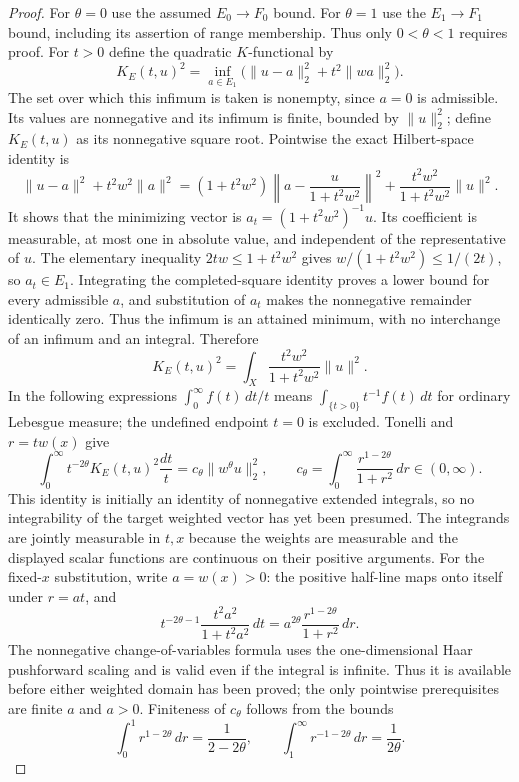 \documentclass[11pt,a4paper]{article}
\theoremstyle{definition}
\theoremstyle{remark}
\begin{document}
\begin{proof}
For $\theta=0$ use the assumed $E_0\to F_0$ bound. For $\theta=1$
use the $E_1\to F_1$ bound, including its assertion of range membership.
Thus only $0<\theta<1$ requires proof. For $t>0$ define the quadratic
$K$-functional by
\[
 K_E(t,u)^2=\inf_{a\in E_1}\bigl(\|u-a\|_2^2+t^2\|wa\|_2^2\bigr).
\]
The set over which this infimum is taken is nonempty, since $a=0$
is admissible. Its values are nonnegative and its infimum is finite,
bounded by $\|u\|_2^2$; define $K_E(t,u)$ as its nonnegative square
root. Pointwise the exact Hilbert-space identity is
\[
 \|u-a\|^2+t^2w^2\|a\|^2
 =(1+t^2w^2)\left\|a-\frac{u}{1+t^2w^2}\right\|^2
   +\frac{t^2w^2}{1+t^2w^2}\|u\|^2.
\]
It shows that the minimizing vector is
$a_t=(1+t^2w^2)^{-1}u$. Its coefficient is measurable, at most one
in absolute value, and independent of the representative of $u$.
The elementary inequality $2tw\leq1+t^2w^2$ gives
$w/(1+t^2w^2)\leq1/(2t)$, so $a_t\in E_1$.
Integrating the completed-square identity proves a lower bound for
every admissible $a$, and substitution of $a_t$ makes the nonnegative
remainder identically zero. Thus the infimum is an attained minimum,
with no interchange of an infimum and an integral. Therefore
\[
 K_E(t,u)^2=\int_X\frac{t^2w^2}{1+t^2w^2}\|u\|^2.
\]
In the following expressions $\int_0^\infty f(t)\,dt/t$ means
$\int_{\{t>0\}} t^{-1}f(t)\,dt$ for ordinary Lebesgue measure;
the undefined endpoint $t=0$ is excluded. Tonelli and $r=tw(x)$ give
\[
 \int_0^\infty t^{-2\theta}K_E(t,u)^2\frac{dt}{t}
 =c_\theta\|w^\theta u\|_2^2,\qquad
 c_\theta=\int_0^\infty\frac{r^{1-2\theta}}{1+r^2}\,dr\in(0,\infty).
\]
This identity is initially an identity of nonnegative extended
integrals, so no integrability of the target weighted vector has yet
been presumed. The integrands are jointly measurable in $t,x$ because
the weights are measurable and the displayed scalar functions are
continuous on their positive arguments. For the fixed-$x$ substitution,
write $a=w(x)>0$: the positive half-line maps onto itself under
$r=at$, and
\[
 t^{-2\theta-1}\frac{t^2a^2}{1+t^2a^2}\,dt
 =a^{2\theta}\frac{r^{1-2\theta}}{1+r^2}\,dr.
\]
The nonnegative change-of-variables formula uses the one-dimensional
Haar pushforward scaling and is valid even if the integral is infinite.
Thus it is available before either weighted domain has been proved;
the only pointwise prerequisites are finite $a$ and $a>0$.
Finiteness of $c_\theta$
follows from the bounds
\[
 \int_0^1 r^{1-2\theta}\,dr=\frac1{2-2\theta},\qquad
 \int_1^\infty r^{-1-2\theta}\,dr=\frac1{2\theta}.
\]
\end{proof}
\end{document}
